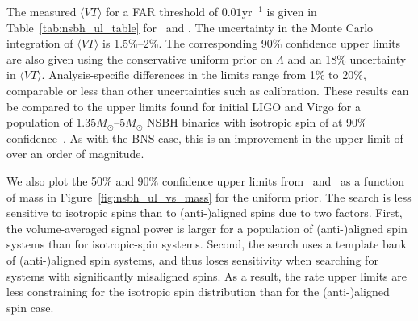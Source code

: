 The measured $\langle VT \rangle$ for a FAR threshold of $0.01 \mathrm{yr}^{-1}$ is given in Table~\ref{tab:nsbh_ul_table}
for \pycbc\ and \gstlal. The uncertainty in the Monte Carlo integration of $\langle VT \rangle$ is 1.5\%--2\%. The corresponding 
90\% confidence upper limits are also given using the conservative 
uniform prior on $\Lambda$ and an 18\% uncertainty in $\langle VT
\rangle$. Analysis-specific differences in the limits range from 1\% to 20\%,
comparable or less than other uncertainties such as calibration.  
These results can be compared to the upper limits found for initial \ac{LIGO} and Virgo
for a population of $1.35M_\odot$--$5M_\odot$ \ac{NSBH} binaries with isotropic spin of
\SSixNSBHULFiveSpin at 90\% confidence~\citep{Colaboration:2011np}.
As with the \ac{BNS} case, this is an improvement in the upper limit of over an order of magnitude.

We also plot the 50\% and 90\% confidence upper limits from \pycbc\ and \gstlal\ as a function of mass in 
Figure~\ref{fig:nsbh_ul_vs_mass} for the uniform prior. The search is
less sensitive to isotropic spins than to (anti-)aligned spins due to two factors.
First, the volume-averaged signal
power is larger for a population of (anti-)aligned spin systems than for isotropic-spin systems.
Second, the search uses a template bank of (anti-)aligned spin systems, and thus loses sensitivity
when searching for systems with significantly misaligned spins.
As a result, the rate upper limits are less constraining
for the isotropic spin distribution than for the (anti-)aligned spin case.
